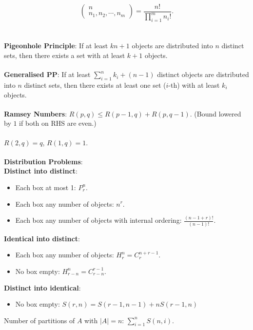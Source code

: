 \documentclass[12pt]{article}
\begin{document}
\begin{multicols}{3}
\begin{equation*}
            \begin{pmatrix}
                n \\
                n_1, n_2, \cdots, n_m
            \end{pmatrix} = \frac{n!}{\prod_{i = 1}^{m}n_i!}.
        \end{equation*}
        \\\\
        \textbf{Pigeonhole Principle}: If at least $kn + 1$ objects are distributed into $n$ distinct sets, then there exists a set with at least $k + 1$ objects.
        \\\\
        \textbf{Generalised PP}: If at least $\sum_{i = 1}^{n}k_i + (n - 1)$ distinct objects are distributed into $n$ distinct sets, then there exists at least one set ($i$-th) with at least $k_i$ objects.
        \\\\
        \textbf{Ramsey Numbers}: $R(p, q) \leq R(p - 1, q) + R(p, q - 1)$. (Bound lowered by $1$ if both on RHS are even.)
        \\\\
        $R(2, q) = q$, $R(1, q) = 1$.
        \\\\
        \textbf{Distribution Problems}:
        \\
        \textbf{Distinct into distinct}:
        \begin{itemize}
            \item Each box at most 1: $P^n_r$.
            \item Each box any number of objects: $n^r$.
            \item Each box any number of objects with internal ordering: $\frac{(n - 1 + r)!}{(n - 1)!}$.
        \end{itemize}
        \textbf{Identical into distinct}: 
        \begin{itemize}
            \item Each box any number of objects: $H^n_r = C^{n + r - 1}_r$.
            \item No box empty: $H^n_{r - n} = C^{r - 1}_{r - n}$.
        \end{itemize}
        \textbf{Distinct into identical}:
        \begin{itemize}
            \item No box empty: $S(r, n) = S(r - 1, n - 1) + nS(r - 1, n)$
        \end{itemize}
        Number of partitions of $A$ with $\left\lvert A \right\rvert = n$: $\sum_{i = 1}^{n}S(n, i)$.

\end{multicols}
\end{document}
